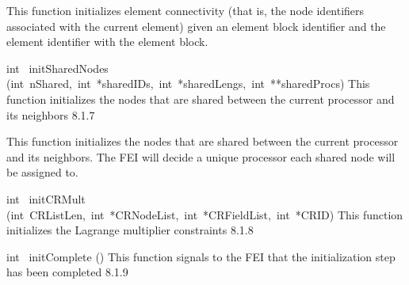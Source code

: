 \documentclass{article}
\begin{document}
\begin{cxxentry}
\begin{cxxentry}
\begin{cxxfunction}
\begin{cxxdoc}
This function initializes element connectivity (that is, the node
identifiers associated with the current element) given an element 
block identifier and the element identifier with the element block.  

\end{cxxdoc}
\end{cxxfunction}
\begin{cxxfunction}
{int\ }
        {initSharedNodes}
        {(int\ nShared,\ int\ *sharedIDs,\ int\ *sharedLengs,\ int\ **sharedProcs)}
        {
This function initializes the nodes that are shared between the
current processor and its neighbors}
        {8.1.7}
\begin{cxxdoc}

This function initializes the nodes that are shared between the
current processor and its neighbors. The FEI will decide a unique
processor each shared node will be assigned to. 

\end{cxxdoc}
\end{cxxfunction}
\begin{cxxfunction}
{int\ }
        {initCRMult}
        {(int\ CRListLen,\ int\ *CRNodeList,\ int\ *CRFieldList,\ int\ *CRID)}
        {
This function initializes the Lagrange multiplier constraints
}
        {8.1.8}
\begin{cxxdoc}

\end{cxxdoc}
\end{cxxfunction}
\begin{cxxfunction}
{int\ }
        {initComplete}
        {()}
        {
This function signals to the FEI that the initialization step has
been completed}
        {8.1.9}
\begin{cxxdoc}


\end{cxxdoc}
\end{cxxfunction}
\end{cxxentry}
\end{cxxentry}
\end{document}
